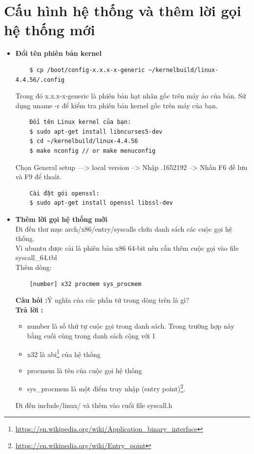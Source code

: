 \documentclass[a4paper,12pt]{article}
\begin{document}
	\section{Cấu hình hệ thống và thêm lời gọi hệ thống mới}
	\begin{itemize}
	\item \textbf{Đổi tên phiên bản kernel}
	\begin{verbatim}
	$ cp /boot/config-x.x.x-x-generic ~/kernelbuild/linux-4.4.56/.config
	\end{verbatim}
	Trong đó x.x.x-x-generic là phiên bản hạt nhân gốc trên máy ảo của bản. Sử dụng uname -r để kiểm tra phiên bản kernel gốc trên máy của bạn.
	\begin{verbatim}
	Đổi tên Linux kernel của bạn:
	$ sudo apt-get install libncurses5-dev
	$ cd ~/kernelbuild/linux-4.4.56
	$ make nconfig // or make menuconfig
	\end{verbatim}
	Chọn General setup ---> local version --> Nhập .1652192 --> Nhấn F6 đề lưu và F9 để thoát.
	\begin{verbatim}
	Cài đặt gói openssl:
	$ sudo apt-get install openssl libssl-dev
	\end{verbatim}
	\item \textbf{Thêm lời gọi hệ thống mới} \\
	Đi đến thư mục arch/x86/entry/syscalls chứa danh sách các cuộc gọi hệ thống. \\
	Vì ubuntu được cài là phiên bản x86 64-bit nên cần thêm cuộc gọi vào file syscall\_64.tbl \\
	Thêm dòng:
	\begin{verbatim}
	[number] x32 procmem sys_procmem
	\end{verbatim}
	\textbf{Câu hỏi :}Ý nghĩa của các phần tử trong dòng trên là gì? \\
	\textbf{Trả lời :}	
	\begin{itemize}
	\item number là số thứ tự cuộc gọi trong danh sách. Trong trường hợp này bằng cuối cùng trong danh sách cộng với 1
	\item x32 là abi\footnote{\url{https://en.wikipedia.org/wiki/Application_binary_interface}} của hệ thống
	\item procmem là tên của cuộc gọi hệ thống
	\item sys\_procmem là một điểm truy nhập (entry point)\footnote{\url{https://en.wikipedia.org/wiki/Entry_point}}.
	\end{itemize}
	Đi đến include/linux/ và thêm vào cuối file syscall.h \\

\end{itemize}
\end{document}
